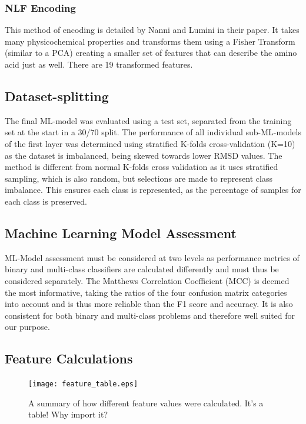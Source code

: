 \documentclass[12pt]{article}
\newcommand{\lilian}[1]{ {\color{red}{\bfseries Lilian:} #1}}
\begin{document}
\subsubsection{NLF Encoding}
This method of encoding is detailed by Nanni and Lumini in their paper. It takes many physicochemical properties and transforms them using a Fisher Transform (similar to a PCA) creating a smaller set of features that can describe the amino acid just as well. There are 19 transformed features. 

\subsection{Dataset-splitting}
The final ML-model was evaluated using a test set, separated from the
training set at the start in a 30/70 split. The performance of all individual sub-ML-models of the first layer was determined using stratified K-folds cross-validation (K=10) as the
dataset is imbalanced, being skewed towards lower RMSD values\cite{Krstajic2014,Kohavi1995}. The
method is different from normal K-folds cross validation as it uses
stratified sampling, which is also random, but selections are made to represent class imbalance.
This ensures each class is represented, as the percentage of samples for each class is
preserved.

\subsection{Machine Learning Model Assessment} 
ML-Model assessment must be considered at two levels as performance
metrics of binary and multi-class classifiers are calculated
differently and must thus be considered separately. The Matthews
Correlation Coefficient (MCC)\cite{Chicco2020} is deemed the most
informative, taking the ratios of the four confusion matrix categories
into account and is thus more reliable than the F1 score and
accuracy. It is also consistent for both binary and multi-class
problems and therefore well suited for our purpose.\cite{Jurman2012}
 
\subsection{Feature Calculations}
\begin{figure}
  \centering
  \texttt{[image: feature\_table.eps]}
  \caption {A summary of how different feature values were calculated. \lilian{It's a table! Why import it?}}
  \label{fig:feature_table}
\end{figure}
\end{document}
